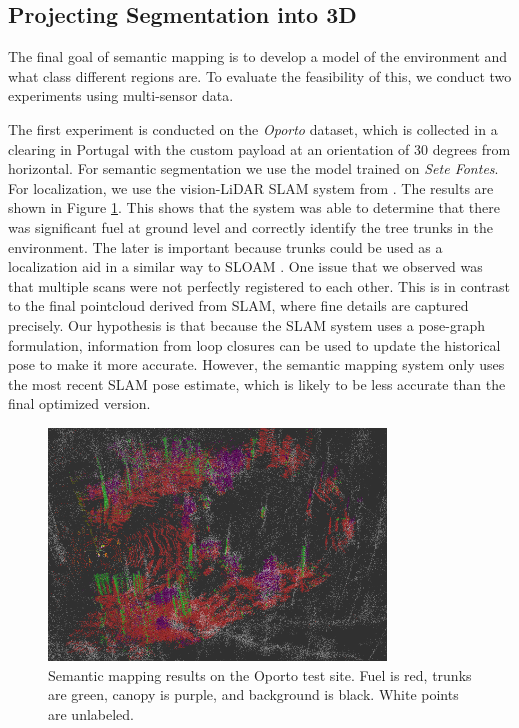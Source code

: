 \subsection{Projecting Segmentation into 3D}
The final goal of semantic mapping is to develop a model of the environment and what class different regions are. To evaluate the feasibility of this, we conduct two experiments using multi-sensor data.

The first experiment is conducted on the \textit{Oporto} dataset, which is collected in a clearing in Portugal with the custom payload at an orientation of 30 degrees from horizontal. For semantic segmentation we use the model trained on \textit{Sete Fontes}. For localization, we use the vision-LiDAR SLAM system from \cite{RussellUnmannedMitigation}.
The results are shown in Figure \ref{fig:results:semantic_mapping_original}. This shows that the system was able to determine that there was significant fuel at ground level and correctly identify the tree trunks in the environment. The later is important because trunks could be used as a localization aid in a similar way to SLOAM \cite{Chen2020SLOAM:Inventory}. One issue that we observed was that multiple scans were not perfectly registered to each other. This is in contrast to the final pointcloud derived from SLAM, where fine details are captured precisely. Our hypothesis is that because the SLAM system uses a pose-graph \cite{Dellaert2017FactorPerception} formulation, information from loop closures can be used to update the historical pose to make it more accurate. However, the semantic mapping system only uses the most recent SLAM pose estimate, which is likely to be less accurate than the final optimized version.

\begin{figure}
    \centering
    \includegraphics[width=0.8\textwidth]{figs/results/semantic_mapping/semantic_cloud_first_approach.png}
    \caption{Semantic mapping results on the Oporto test site. Fuel is red, trunks are green, canopy is purple, and background is black. White points are unlabeled.}
    \label{fig:results:semantic_mapping_original}
\end{figure}

